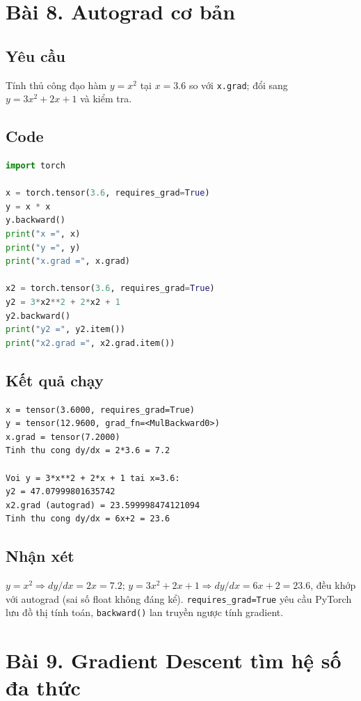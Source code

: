 \documentclass[a4paper,13pt]{article}
\begin{document}
\newpage
\section{Bài 8. Autograd cơ bản}

\subsection{Yêu cầu}
Tính thủ công đạo hàm $y=x^2$ tại $x=3.6$ so với \texttt{x.grad}; đổi sang $y=3x^2+2x+1$ và kiểm tra.

\subsection{Code}
\begin{lstlisting}[language=Python]
import torch

x = torch.tensor(3.6, requires_grad=True)
y = x * x
y.backward()
print("x =", x)
print("y =", y)
print("x.grad =", x.grad)

x2 = torch.tensor(3.6, requires_grad=True)
y2 = 3*x2**2 + 2*x2 + 1
y2.backward()
print("y2 =", y2.item())
print("x2.grad =", x2.grad.item())
\end{lstlisting}

\subsection{Kết quả chạy}
\begin{lstlisting}[backgroundcolor=\color{outgray}]
x = tensor(3.6000, requires_grad=True)
y = tensor(12.9600, grad_fn=<MulBackward0>)
x.grad = tensor(7.2000)
Tinh thu cong dy/dx = 2*3.6 = 7.2

Voi y = 3*x**2 + 2*x + 1 tai x=3.6:
y2 = 47.07999801635742
x2.grad (autograd) = 23.599998474121094
Tinh thu cong dy/dx = 6x+2 = 23.6
\end{lstlisting}

\subsection{Nhận xét}
$y=x^2 \Rightarrow dy/dx=2x=7.2$; $y=3x^2+2x+1 \Rightarrow dy/dx=6x+2=23.6$, đều khớp với autograd (sai số float không đáng kể). \texttt{requires\_grad=True} yêu cầu PyTorch lưu đồ thị tính toán, \texttt{backward()} lan truyền ngược tính gradient.

\newpage
\section{Bài 9. Gradient Descent tìm hệ số đa thức}
\end{document}
